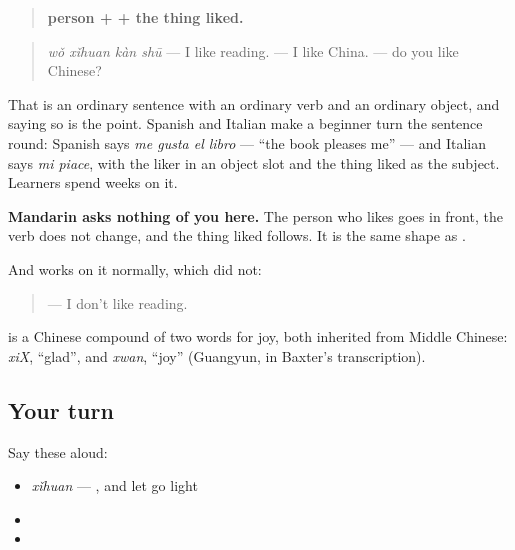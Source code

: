 \begin{grammarlens}[title={Grammar Lens: the liker is the subject, and that is all}]
\begin{quote}
\textbf{person +  + the thing liked.}
\end{quote}

\begin{quote}
\textbf{} \emph{wǒ xǐhuan kàn shū} — I like reading. \textbf{} — I like China. \textbf{} — do you like Chinese?
\end{quote}

That is an ordinary sentence with an ordinary verb and an ordinary object, and saying so is the point. Spanish and Italian make a beginner turn the sentence round: Spanish says \emph{me gusta el libro} — \textquotedblleft{}the book pleases me\textquotedblright{} — and Italian says \emph{mi piace}, with the liker in an object slot and the thing liked as the subject. Learners spend weeks on it.

\textbf{Mandarin asks nothing of you here.} The person who likes goes in front, the verb does not change, and the thing liked follows. It is the same shape as .

And  works on it normally, which  did not:

\begin{quote}
\textbf{} — I don't like reading.
\end{quote}
\end{grammarlens}

\begin{cousinweb}
\textbf{} is a Chinese compound of two words for joy, both inherited from Middle Chinese: \emph{xiX}, \textquotedblleft{}glad\textquotedblright{}, and \emph{xwan}, \textquotedblleft{}joy\textquotedblright{} (Guangyun, in Baxter's transcription).
\end{cousinweb}

\subsection*{Your turn}
Say these aloud:

\begin{itemize}
\raggedright
  \item \emph{xǐhuan} — , and let  go light
  \item {}
  \item {}
\end{itemize}

